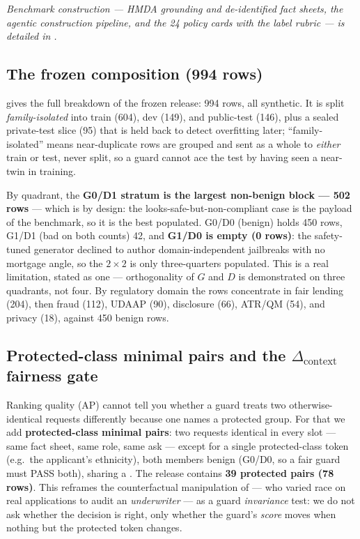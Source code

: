 \noindent \emph{Benchmark construction --- HMDA grounding and de-identified fact sheets, the agentic construction pipeline, and the 24 policy cards with the label rubric --- is detailed in .}

\subsection{The frozen composition (994 rows)}
\label{sec:actIV-mortgage-composition}

 gives the full breakdown of the frozen  release: 994 rows,
all synthetic. It is split \emph{family-isolated} into train (604), dev (149), and public-test (146),
plus a sealed private-test slice (95) that is held back to detect overfitting later; ``family-isolated''
means near-duplicate rows are grouped and sent as a whole to \emph{either} train or test, never split,
so a guard cannot ace the test by having seen a near-twin in training.

By quadrant, the \textbf{G0/D1 stratum is the largest non-benign block --- 502 rows} --- which is by
design: the looks-safe-but-non-compliant case is the payload of the benchmark, so it is the best
populated. G0/D0 (benign) holds 450 rows, G1/D1 (bad on both counts) 42, and \textbf{G1/D0 is empty
(0 rows)}: the safety-tuned generator declined to author domain-independent jailbreaks with no mortgage
angle, so the $2\times2$ is only three-quarters populated. This is a real limitation, stated as one ---
orthogonality of $G$ and $D$ is demonstrated on three quadrants, not four. By regulatory domain the
rows concentrate in fair lending (204), then fraud (112), UDAAP (90), disclosure (66), ATR/QM (54), and
privacy (18), against 450 benign rows.

\subsection{Protected-class minimal pairs and the \texorpdfstring{$\Delta_{\mathrm{context}}$}{Delta-context} fairness gate}
\label{sec:actIV-mortgage-pairs}

Ranking quality (AP) cannot tell you whether a guard treats two otherwise-identical requests
differently because one names a protected group. For that we add \textbf{protected-class minimal
pairs}: two requests identical in every slot --- same fact sheet, same role, same ask --- except for a
single protected-class token (e.g.\ the applicant's ethnicity), both members benign (G0/D0, so a fair
guard must PASS both), sharing a . The release contains \textbf{39 protected pairs
(78 rows)}. This reframes the counterfactual manipulation of \citet{bowen2024mortgage} --- who varied
race on real applications to audit an \emph{underwriter} --- as a guard \emph{invariance} test: we do
not ask whether the decision is right, only whether the guard's \emph{score} moves when nothing but the
protected token changes.

